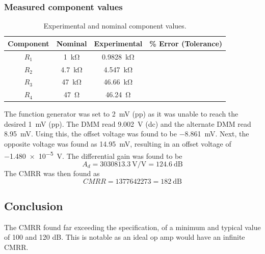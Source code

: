 \documentclass{report}
\begin{document}
\subsubsection{Measured component values}
\begin{table}[h]
	\centering
	\caption{Experimental and nominal component values.}
	\label{table:lab2components}
	\begin{threeparttable}
		\begin{tabular}{cccc}
			\toprule
			Component & Nominal & Experimental & \% Error (Tolerance) \\
			\midrule
			$R_1$ & \SI{1}{\kohm} & \SI{0.9828}{\kohm} & \\
			$R_2$ & \SI{4.7}{\kohm} & \SI{4.547}{\kohm} & \\
			$R_3$ & \SI{47}{\kohm} & \SI{46.66}{\kohm} & \\
			$R_4$ & \SI{47}{\ohm} & \SI{46.24}{\ohm} & \\
			\bottomrule
		\end{tabular}
	\end{threeparttable}
\end{table}
The function generator was set to \SI{2}{\mV} (pp) as it was unable to reach the desired \SI{1}{\mV} (pp). The DMM read \SI{9.002}{\V} (dc) and the alternate DMM read \SI{8.95}{\mV}. Using this, the offset voltage was found to be \SI{-8.861}{\mV}. Next, the opposite voltage was found as \SI{14.95}{\mV}, resulting in an offset voltage of \SI{-1.480e-5}{\V}. 
The differential gain was found to be
\[ A_d = \SI{3030813.3}{\V/\V} = \SI{124.6}{\dB} \]
The CMRR was then found as
\[ CMRR = \num{1377642273} = \SI{182}{\dB} \]

\subsection{Conclusion}
The CMRR found far exceeding the specification, of a minimum and typical value of 100 and 120 dB. This is notable as an ideal op amp would have an infinite CMRR. 
\end{document}

